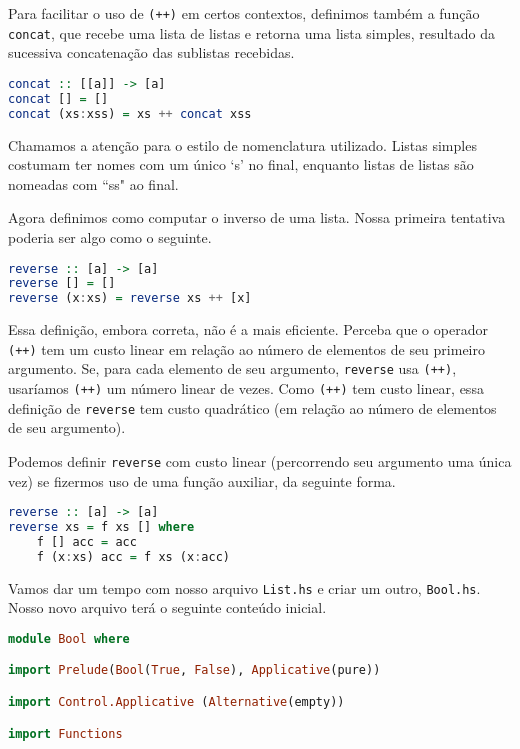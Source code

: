\documentclass[a4paper]{article}
\begin{document}
Para facilitar o uso de \texttt{(++)} em certos contextos, definimos também a função \texttt{concat}, que recebe uma lista de listas e retorna uma lista simples, resultado da sucessiva concatenação das sublistas recebidas.

\begin{lstlisting}[language=haskell, frame=single]
concat :: [[a]] -> [a]
concat [] = []
concat (xs:xss) = xs ++ concat xss
\end{lstlisting}

Chamamos a atenção para o estilo de nomenclatura utilizado.
Listas simples costumam ter nomes com um único `s' no final, enquanto listas de listas são nomeadas com ``ss" ao final.

Agora definimos como computar o inverso de uma lista.
Nossa primeira tentativa poderia ser algo como o seguinte.

\begin{lstlisting}[language=haskell, frame=single]
reverse :: [a] -> [a]
reverse [] = []
reverse (x:xs) = reverse xs ++ [x]
\end{lstlisting}

Essa definição, embora correta, não é a mais eficiente.
Perceba que o operador \texttt{(++)} tem um custo linear em relação ao número de elementos de seu primeiro argumento.
Se, para cada elemento de seu argumento, \texttt{reverse} usa \texttt{(++)}, usaríamos \texttt{(++)} um número linear de vezes.
Como \texttt{(++)} tem custo linear, essa definição de \texttt{reverse} tem custo quadrático (em relação ao número de elementos de seu argumento).

Podemos definir \texttt{reverse} com custo linear (percorrendo seu argumento uma única vez) se fizermos uso de uma função auxiliar, da seguinte forma.

\begin{lstlisting}[language=haskell, frame=single]
reverse :: [a] -> [a]
reverse xs = f xs [] where
	f [] acc = acc
	f (x:xs) acc = f xs (x:acc)
\end{lstlisting}

Vamos dar um tempo com nosso arquivo \texttt{List.hs} e criar um outro, \texttt{Bool.hs}.
Nosso novo arquivo terá o seguinte conteúdo inicial.

\begin{lstlisting}[language=haskell, frame=single]
module Bool where

import Prelude(Bool(True, False), Applicative(pure))

import Control.Applicative (Alternative(empty))

import Functions
\end{lstlisting}
\end{document}
